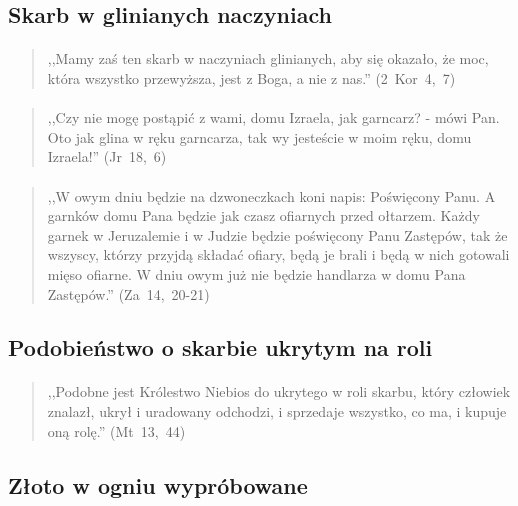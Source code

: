 \documentclass[10pt,a4paper,oneside]{article}
\begin{document}
\subsection{Skarb w glinianych naczyniach}
\paragraph{}
\begin{quote}
,,Mamy zaś ten skarb w naczyniach glinianych, aby się okazało, że moc, która wszystko przewyższa, jest z Boga, a nie z nas.'' \mbox{(2 Kor 4, 7)}
\end{quote}
\paragraph{}
\begin{quote}
,,Czy nie mogę postąpić z wami, domu Izraela, jak garncarz? - mówi Pan. Oto jak glina w ręku garncarza, tak wy jesteście w moim ręku, domu Izraela!'' \mbox{(Jr 18, 6)}
\end{quote}
\paragraph{}
\begin{quote}
,,W owym dniu będzie na dzwoneczkach koni napis: Poświęcony Panu. A garnków domu Pana będzie jak czasz ofiarnych przed ołtarzem. Każdy garnek w Jeruzalemie i w Judzie będzie poświęcony Panu Zastępów, tak że wszyscy, którzy przyjdą składać ofiary, będą je brali i będą w nich gotowali mięso ofiarne. W dniu owym już nie będzie handlarza w domu Pana Zastępów.'' \mbox{(Za 14, 20-21)}
\end{quote}
\subsection{Podobieństwo o skarbie ukrytym na roli}
\paragraph{}
\begin{quote}
,,Podobne jest Królestwo Niebios do ukrytego w roli skarbu, który człowiek znalazł, ukrył i uradowany odchodzi, i sprzedaje wszystko, co ma, i kupuje oną rolę.'' \mbox{(Mt 13, 44)}
\end{quote}
\subsection{Złoto w ogniu wypróbowane}
\end{document}
